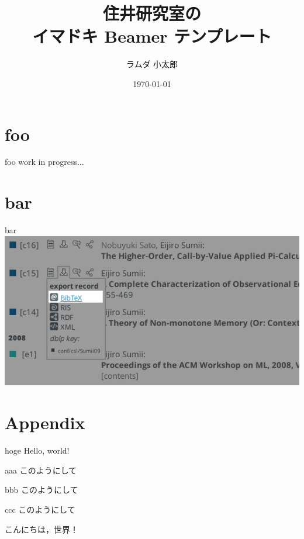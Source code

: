 \documentclass[uplatex,dvipdfmx,14pt,aspectratio=169]{beamer}%
\title{住井研究室の\\イマドキ Beamer テンプレート}
\author{ラムダ 小太郎}
\institute[東北大学　住井・松田研]{大学院情報科学研究科　情報基礎科学専攻\\住井・松田研究室}%
\date{\today}
\begin{document}
  \maketitle

  \section{foo}
  \begin{frame}{foo}
    work in progress...
    
  \end{frame}

  \section{bar}
  \begin{frame}{bar}
    \centering
    \includegraphics[scale=0.6]{../docs/dblp_bibtex_link.png}

  \end{frame}

  \appendix
  \section{Appendix}
  \begin{frame}{hoge}
    Hello, world!

    \begin{block}{aaa}
      このようにして
    \end{block}
    \begin{exampleblock}{bbb}
      このようにして
    \end{exampleblock}
    \begin{alertblock}{ccc}
      このようにして
    \end{alertblock}
    
    こんにちは，世界！
  \end{frame}
\end{document}
